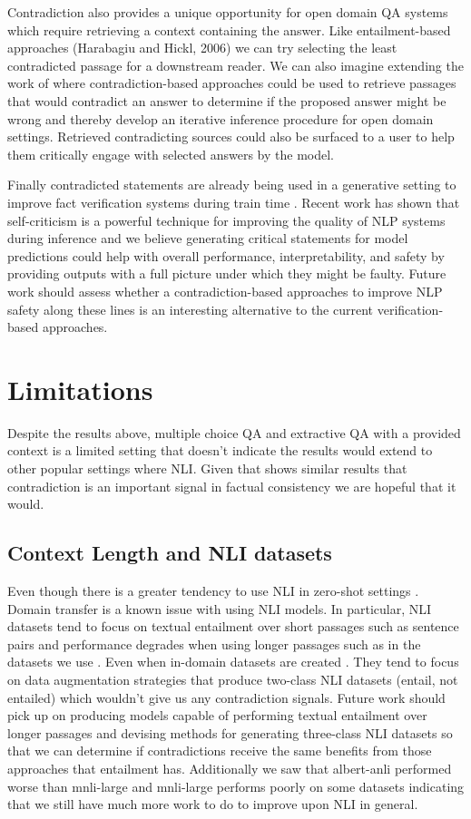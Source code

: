 \documentclass[11pt]{article}
\begin{document}
Contradiction also provides a unique opportunity for open domain QA systems which require retrieving a context containing the answer. Like entailment-based approaches (Harabagiu and Hickl, 2006) we can try selecting the least contradicted passage for a downstream reader. We can also imagine extending the work of \citet{schuster_stretching_2022} where contradiction-based approaches could be used to retrieve passages that would contradict an answer to determine if the proposed answer might be wrong and thereby develop an iterative inference procedure for open domain settings. Retrieved contradicting sources could also be surfaced to a user to help them critically engage with selected answers by the model.

Finally contradicted statements are already being used in a generative setting to improve fact verification systems during train time \citep{wright_generating_2022, pan_zero-shot_2021, saakyan_covid-fact_2021}. Recent work \citep{saunders_self-critiquing_2022} has shown that self-criticism is a powerful technique for improving the quality of NLP systems during inference and we believe generating critical statements for model predictions could help with overall performance, interpretability, and safety by providing outputs with a full picture under which they might be faulty. Future work should assess whether a contradiction-based approaches to improve NLP safety along these lines is an interesting alternative to the current verification-based approaches.
\section{Limitations}
Despite the results above, multiple choice QA and extractive QA with a provided context is a limited setting that doesn’t indicate the results would extend to other popular settings where NLI. Given that \citet{laban_summac_2022} shows similar results that contradiction is an important signal in factual consistency we are hopeful that it would.
\subsection{Context Length and NLI datasets}
Even though there is a greater tendency to use NLI in zero-shot settings \citep{yin_universal_2020}. Domain transfer is a known issue with using NLI models. In particular, NLI datasets tend to focus on textual entailment over short passages such as sentence pairs and performance degrades when using longer passages such as in the datasets we use \citep{mishra_looking_2021}. Even when in-domain datasets are created \citep{chen_can_2021, khot_scitail_2018, mishra_looking_2021}. They tend to focus on data augmentation strategies that produce two-class NLI datasets (entail, not entailed) which wouldn’t give us any contradiction signals. Future work should pick up on producing models capable of performing textual entailment over longer passages and devising methods for generating three-class NLI datasets so that we can determine if contradictions receive the same benefits from those approaches that entailment has. Additionally we saw that albert-anli performed worse than mnli-large and mnli-large performs poorly on some datasets indicating that we still have much more work to do to improve upon NLI in general.
\end{document}
